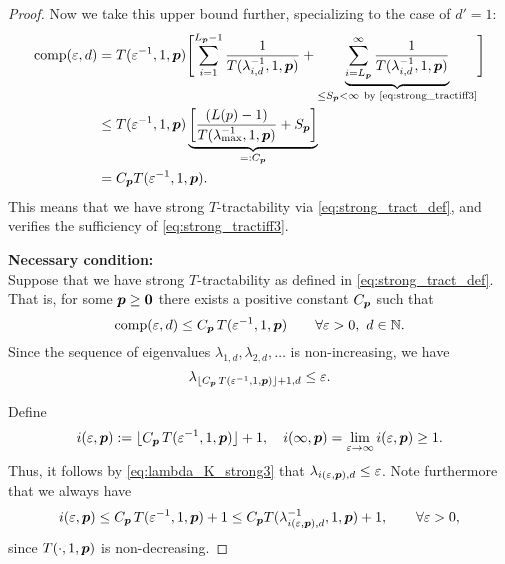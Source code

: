 \documentclass[11pt,a4paper]{article}
\begin{document}
\begin{proof}
Now we take this upper bound further, specializing to the case of $d'=1$:
\begin{align*}
       \operatorname{comp}(\varepsilon,d)
       & = T(\varepsilon^{-1},1, \boldsymbol{p}) \Biggl [ \sum_{i=1}^{L_{\boldsymbol{p}}-1} \frac{1}{T(\lambda_{i, d}^{-1},1,\boldsymbol{p})}
       + \underbrace{\sum_{i=L_{\boldsymbol{p}}}^\infty \frac{1}{T(\lambda_{i, d}^{-1},1,\boldsymbol{p})}}_{\le S_{\boldsymbol{p}} <\infty\ \text{by \eqref{eq:strong_tractiff3}} }\Biggr] \\
       & \le T(\varepsilon^{-1},1,\boldsymbol{p}) \underbrace{\left[\frac{(L(p)-1)}{T(\lambda_{\max}^{-1},1,\boldsymbol{p})} + S_{\boldsymbol{p}}\right]}_{=:C_{\boldsymbol{p}}}\\
       & =  C_{\boldsymbol{p}}T(\varepsilon^{-1},1,\boldsymbol{p}).
\end{align*}
This means that we have strong $T$-tractability via \eqref{eq:strong_tract_def}, and verifies the sufficiency of \eqref{eq:strong_tractiff3}.



\bigskip
\noindent \textbf{Necessary condition:} \\
Suppose that we have strong
$T$-tractability as defined in \eqref{eq:strong_tract_def}. That is, for some $\boldsymbol{p} \ge \boldsymbol{0}$ there exists a positive constant $C_{\boldsymbol{p}}$ such that
\[
\operatorname{comp}(\varepsilon,d)\le C_{\boldsymbol{p}}\, T(\varepsilon^{-1},1,\boldsymbol{p})
\qquad \forall \varepsilon > 0, \ d \in \mathbb{N}.
\]
Since the sequence of eigenvalues $\lambda_{1,d}, \lambda_{2,d}, \ldots $ is non-increasing, we have
\begin{equation}\label{eq:lambda_K_strong3}
\lambda_{\lfloor C_{\boldsymbol{p}}\, T(\varepsilon^{-1},1,\boldsymbol{p})\rfloor +1,d}\le \varepsilon.
\end{equation}

Define
\[
i(\varepsilon,\boldsymbol{p}):= \lfloor C_{\boldsymbol{p}}\, T(\varepsilon^{-1},1,\boldsymbol{p})\rfloor +1, \quad
i(\infty,\boldsymbol{p}) = \lim_{\varepsilon \to \infty}  i(\varepsilon,\boldsymbol{p}) \ge 1 .
\]
Thus, it follows by \eqref{eq:lambda_K_strong3} that $\lambda_{i(\varepsilon,\boldsymbol{p}),d} \le \varepsilon$.
Note furthermore that we always have
\[
i(\varepsilon,\boldsymbol{p})\le C_{\boldsymbol{p}}\, T(\varepsilon^{-1},1,\boldsymbol{p})+1 \le C_{\boldsymbol{p}} T(\lambda_{i(\varepsilon,\boldsymbol{p}),d}^{-1},1,\boldsymbol{p})+1, \qquad \forall \varepsilon > 0,
\]
since
$T(\cdot,1, \boldsymbol{p})$ is non-decreasing.


\end{proof}
\end{document}
